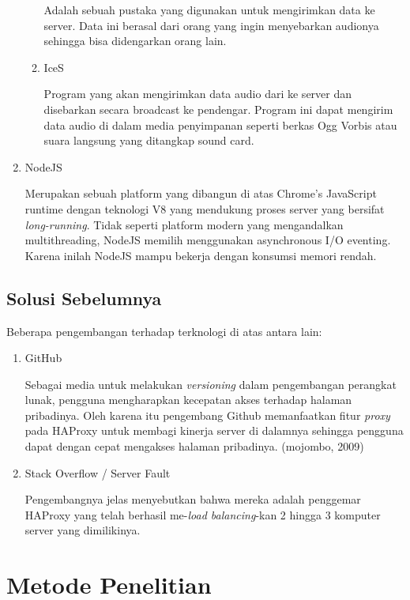 \documentclass[oneside]{book}
\begin{document}
\begin{enumerate}
\begin{enumerate}
			Adalah sebuah pustaka yang digunakan untuk mengirimkan data ke server. Data ini berasal dari orang yang ingin menyebarkan audionya sehingga bisa didengarkan orang lain.
			
			\item IceS
			
			Program yang akan mengirimkan data audio dari ke server dan disebarkan secara broadcast ke pendengar. Program ini dapat mengirim data audio di dalam media penyimpanan seperti berkas Ogg Vorbis atau suara langsung yang ditangkap sound card.
		\end{enumerate}
		
		\item NodeJS
		
		Merupakan sebuah platform yang dibangun di atas Chrome's JavaScript runtime dengan teknologi V8 yang mendukung proses server yang bersifat \textit{long-running}. Tidak seperti platform modern yang mengandalkan multithreading, NodeJS memilih menggunakan asynchronous I/O eventing. Karena inilah NodeJS mampu bekerja dengan konsumsi memori rendah.
		
		
		
	\end{enumerate}
	
	\section{Solusi Sebelumnya}
	
	Beberapa pengembangan terhadap terknologi di atas antara lain:
	
	\begin{enumerate}
		\item GitHub
		
		Sebagai media untuk melakukan \textit{versioning} dalam pengembangan perangkat lunak, pengguna mengharapkan kecepatan akses terhadap halaman pribadinya. Oleh karena itu pengembang Github memanfaatkan fitur \textit{proxy} pada HAProxy untuk membagi kinerja server di dalamnya sehingga pengguna dapat dengan cepat mengakses halaman pribadinya. (mojombo, 2009)
		
		\item Stack Overflow / Server Fault
		
		Pengembangnya jelas menyebutkan bahwa mereka adalah penggemar HAProxy yang telah berhasil me-\textit{load balancing}-kan 2 hingga 3 komputer server yang dimilikinya.
	\end{enumerate}

	\chapter{Metode Penelitian}
	
\end{document}
